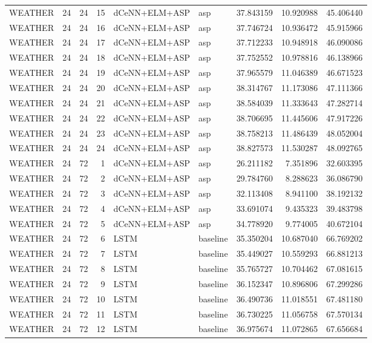 \begin{table}
\begin{tabular}{lrrrllrrr}
WEATHER & 24 & 24 & 15 & dCeNN+ELM+ASP & asp & 37.843159 & 10.920988 & 45.406440 \\
WEATHER & 24 & 24 & 16 & dCeNN+ELM+ASP & asp & 37.746724 & 10.936472 & 45.915966 \\
WEATHER & 24 & 24 & 17 & dCeNN+ELM+ASP & asp & 37.712233 & 10.948918 & 46.090086 \\
WEATHER & 24 & 24 & 18 & dCeNN+ELM+ASP & asp & 37.752552 & 10.978816 & 46.138966 \\
WEATHER & 24 & 24 & 19 & dCeNN+ELM+ASP & asp & 37.965579 & 11.046389 & 46.671523 \\
WEATHER & 24 & 24 & 20 & dCeNN+ELM+ASP & asp & 38.314767 & 11.173086 & 47.111366 \\
WEATHER & 24 & 24 & 21 & dCeNN+ELM+ASP & asp & 38.584039 & 11.333643 & 47.282714 \\
WEATHER & 24 & 24 & 22 & dCeNN+ELM+ASP & asp & 38.706695 & 11.445606 & 47.917226 \\
WEATHER & 24 & 24 & 23 & dCeNN+ELM+ASP & asp & 38.758213 & 11.486439 & 48.052004 \\
WEATHER & 24 & 24 & 24 & dCeNN+ELM+ASP & asp & 38.827573 & 11.530287 & 48.092765 \\
WEATHER & 24 & 72 & 1 & dCeNN+ELM+ASP & asp & 26.211182 & 7.351896 & 32.603395 \\
WEATHER & 24 & 72 & 2 & dCeNN+ELM+ASP & asp & 29.784760 & 8.288623 & 36.086790 \\
WEATHER & 24 & 72 & 3 & dCeNN+ELM+ASP & asp & 32.113408 & 8.941100 & 38.192132 \\
WEATHER & 24 & 72 & 4 & dCeNN+ELM+ASP & asp & 33.691074 & 9.435323 & 39.483798 \\
WEATHER & 24 & 72 & 5 & dCeNN+ELM+ASP & asp & 34.778920 & 9.774005 & 40.672104 \\
WEATHER & 24 & 72 & 6 & LSTM & baseline & 35.350204 & 10.687040 & 66.769202 \\
WEATHER & 24 & 72 & 7 & LSTM & baseline & 35.449027 & 10.559293 & 66.881213 \\
WEATHER & 24 & 72 & 8 & LSTM & baseline & 35.765727 & 10.704462 & 67.081615 \\
WEATHER & 24 & 72 & 9 & LSTM & baseline & 36.152347 & 10.896806 & 67.299286 \\
WEATHER & 24 & 72 & 10 & LSTM & baseline & 36.490736 & 11.018551 & 67.481180 \\
WEATHER & 24 & 72 & 11 & LSTM & baseline & 36.730225 & 11.056758 & 67.570134 \\
WEATHER & 24 & 72 & 12 & LSTM & baseline & 36.975674 & 11.072865 & 67.656684 \\

\end{tabular}
\end{table}
